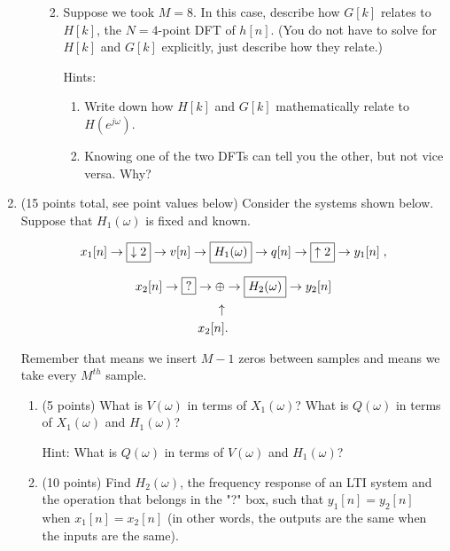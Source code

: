 \documentclass[]{siamltex}
\begin{document}
\begin{enumerate}
\begin{enumerate}
\begin{enumerate}
		\vspace{1in} 
		
		
		\item Suppose we took $M=8$. In this case, describe how $G[k]$ relates to $H[k]$, the $N=4$-point DFT of $h[n]$. (You do not have to solve for $H[k]$ and $G[k]$ explicitly, just describe how they relate.)
		
		Hints: 
			\begin{enumerate}
			\item Write down how $H[k]$ and $G[k]$ mathematically relate to $H(e^{j\omega})$. 
			\item Knowing one of the two DFTs can tell you the other, but not vice versa. Why?
			\end{enumerate}
		\end{enumerate}
	\end{enumerate}



\newpage
\item (15 points total, see point values below) Consider the systems shown below. Suppose that $H_1(\omega)$ is fixed and known. 

$$x_1[n] \rightarrow \fbox{$\downarrow 2$} \rightarrow v[n]  \rightarrow \fbox{$H_1(\omega)$}  \rightarrow q[n]\rightarrow \fbox{$\uparrow 2$} \rightarrow y_1[n]\;,$$


\begin{eqnarray*} x_2[n] \rightarrow \fbox{?} \rightarrow \oplus & \rightarrow \fbox{$H_2(\omega)$} \rightarrow y_2[n]  \\
\uparrow & \\
x_2[n] & .
\end{eqnarray*} 

\vspace{3mm} Remember that  means we insert $M-1$ zeros between samples and  means we take every $M^{th}$ sample.

\vspace{3mm} 
	\begin{enumerate}
	\item (5 points) What is $V(\omega)$ in terms of $X_1(\omega)$? What is $Q(\omega)$ in terms of $X_1(\omega)$ and $H_1(\omega)$?
	
	Hint: What is $Q(\omega)$ in terms of $V(\omega)$ and $H_1(\omega)$?
	
	\vspace{2cm} \item (10 points) Find $H_2(\omega)$, the frequency response of an LTI system and the operation that belongs in the "?" box, such that $y_1[n] = y_2[n]$ when $x_1[n] = x_2[n]$ (in other words, the outputs are the same when the inputs are the same).
	

\end{enumerate}
\end{enumerate}
\end{document}
